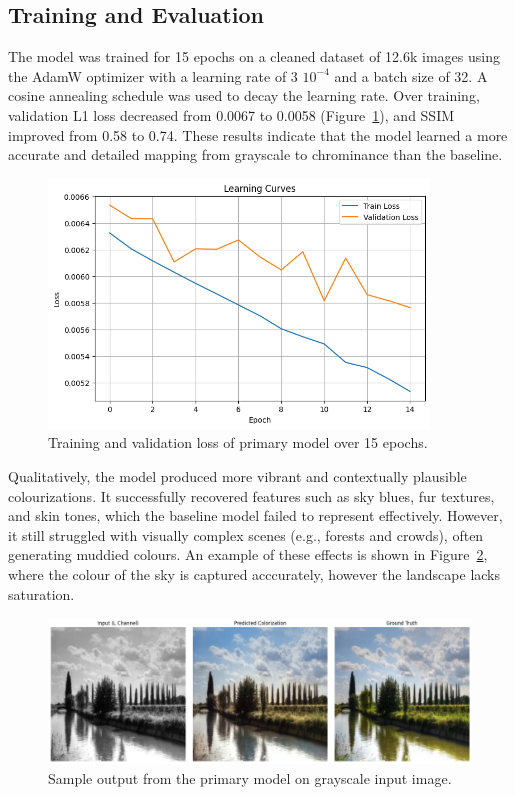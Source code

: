 \documentclass{article} %
\begin{document}
\subsection{Training and Evaluation}

The model was trained for 15 epochs on a cleaned dataset of 12.6k images using the AdamW optimizer with a learning rate of 3 \texttimes $10^{-4}$ and a batch size of 32. A cosine annealing schedule was used to decay the learning rate. Over training, validation L1 loss decreased from 0.0067 to 0.0058 (Figure~\ref{fig:primary_learning_curve}), and SSIM improved from 0.58 to 0.74. These results indicate that the model learned a more accurate and detailed mapping from grayscale to chrominance than the baseline.

\begin{figure}[htbp]
    \centering
    \includegraphics[width=0.9\textwidth]{Figs/primary_learning_curve.png}
    \caption{Training and validation loss of primary model over 15 epochs.}
    \label{fig:primary_learning_curve}
\end{figure}
\FloatBarrier

Qualitatively, the model produced more vibrant and contextually plausible colourizations. It successfully recovered features such as sky blues, fur textures, and skin tones, which the baseline model failed to represent effectively. However, it still struggled with visually complex scenes (e.g., forests and crowds), often generating muddied colours. An example of these effects is shown in Figure~\ref{fig:primary_model_results}, where the colour of the sky is captured acccurately, however the landscape lacks saturation.

\begin{figure}[htbp]
    \centering
    \includegraphics[width=\textwidth]{Figs/primary_model_results.png}
    \caption{Sample output from the primary model on grayscale input image.}
    \label{fig:primary_model_results}
\end{figure}
\FloatBarrier
\end{document}
